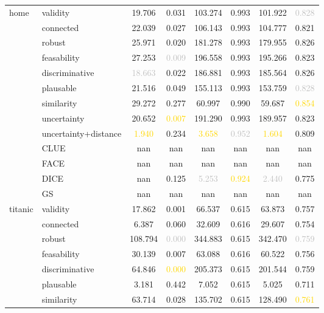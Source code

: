 \begin{table}[ht]
\begin{tabular}{l l c c c c c c}
\hline
\multirow{13}{*}{home} & validity & \textcolor{bronze}{19.706} & 0.031 & 103.274 & 0.993 & 101.922 & \textcolor{silver}{0.828} \\
 & connected & 22.039 & 0.027 & 106.143 & 0.993 & 104.777 & 0.821 \\
 & robust & 25.971 & \textcolor{bronze}{0.020} & 181.278 & 0.993 & 179.955 & \textcolor{bronze}{0.826} \\
 & feasability & 27.253 & \textcolor{silver}{0.009} & 196.558 & 0.993 & 195.266 & 0.823 \\
 & discriminative & \textcolor{silver}{18.663} & 0.022 & 186.881 & 0.993 & 185.564 & \textcolor{bronze}{0.826} \\
 & plausable & 21.516 & 0.049 & 155.113 & 0.993 & 153.759 & \textcolor{silver}{0.828} \\
 & similarity & 29.272 & 0.277 & \textcolor{bronze}{60.997} & \textcolor{bronze}{0.990} & \textcolor{bronze}{59.687} & \textcolor{gold}{0.854} \\
 & uncertainty & 20.652 & \textcolor{gold}{0.007} & 191.290 & 0.993 & 189.957 & 0.823 \\
 & uncertainty+distance & \textcolor{gold}{1.940} & 0.234 & \textcolor{gold}{3.658} & \textcolor{silver}{0.952} & \textcolor{gold}{1.604} & 0.809 \\
 & CLUE & nan & nan & nan & nan & nan & nan \\
 & FACE & nan & nan & nan & nan & nan & nan \\
 & DICE & nan & 0.125 & \textcolor{silver}{5.253} & \textcolor{gold}{0.924} & \textcolor{silver}{2.440} & 0.775 \\
 & GS & nan & nan & nan & nan & nan & nan \\
\hline
\multirow{13}{*}{titanic} & validity & 17.862 & \textcolor{bronze}{0.001} & 66.537 & 0.615 & 63.873 & 0.757 \\
 & connected & 6.387 & 0.060 & 32.609 & 0.616 & 29.607 & 0.754 \\
 & robust & 108.794 & \textcolor{silver}{0.000} & 344.883 & 0.615 & 342.470 & \textcolor{silver}{0.759} \\
 & feasability & 30.139 & 0.007 & 63.088 & 0.616 & 60.522 & 0.756 \\
 & discriminative & 64.846 & \textcolor{gold}{0.000} & 205.373 & 0.615 & 201.544 & \textcolor{bronze}{0.759} \\
 & plausable & 3.181 & 0.442 & 7.052 & 0.615 & 5.025 & 0.711 \\
 & similarity & 63.714 & 0.028 & 135.702 & 0.615 & 128.490 & \textcolor{gold}{0.761} \\

\end{tabular}
\end{table}
